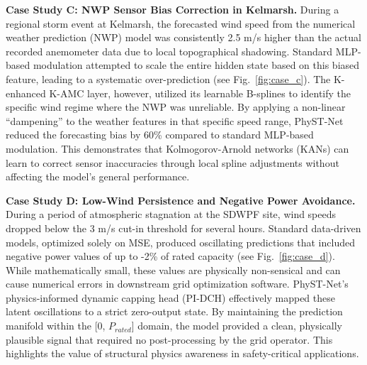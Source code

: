 \textbf{Case Study C: NWP Sensor Bias Correction in Kelmarsh.} 
During a regional storm event at Kelmarsh, the forecasted wind speed from the numerical weather prediction (NWP) model was consistently 2.5 m/s higher than the actual recorded anemometer data due to local topographical shadowing. Standard MLP-based modulation attempted to scale the entire hidden state based on this biased feature, leading to a systematic over-prediction (see Fig.~\ref{fig:case_c}). The K-enhanced K-AMC layer, however, utilized its learnable B-splines to identify the specific wind regime where the NWP was unreliable. By applying a non-linear ``dampening'' to the weather features in that specific speed range, PhyST-Net reduced the forecasting bias by 60\% compared to standard MLP-based modulation. This demonstrates that Kolmogorov-Arnold networks (KANs) can learn to correct sensor inaccuracies through local spline adjustments without affecting the model's general performance.

\textbf{Case Study D: Low-Wind Persistence and Negative Power Avoidance.} 
During a period of atmospheric stagnation at the SDWPF site, wind speeds dropped below the 3 m/s cut-in threshold for several hours. Standard data-driven models, optimized solely on MSE, produced oscillating predictions that included negative power values of up to -2\% of rated capacity (see Fig.~\ref{fig:case_d}). While mathematically small, these values are physically non-sensical and can cause numerical errors in downstream grid optimization software. PhyST-Net's physics-informed dynamic capping head (PI-DCH) effectively mapped these latent oscillations to a strict zero-output state. By maintaining the prediction manifold within the [0, $P_{rated}$] domain, the model provided a clean, physically plausible signal that required no post-processing by the grid operator. This highlights the value of structural physics awareness in safety-critical applications.

